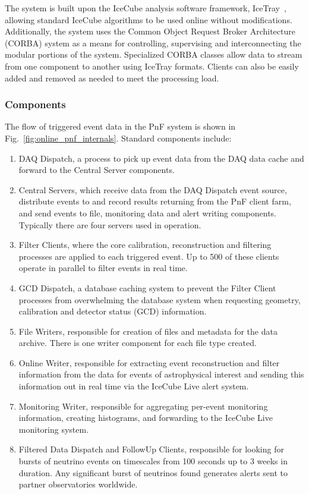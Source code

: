 The system is built upon the IceCube analysis software framework,
IceTray~\cite{DeYoung:2005zz}, allowing standard IceCube algorithms to be
used online without modifications.
Additionally, the system uses the Common Object Request Broker Architecture
(CORBA) system as a means for controlling, supervising and interconnecting
the modular portions of the system.  Specialized CORBA classes allow
data to stream from one component to another using IceTray formats.
Clients can also be easily added and removed as needed to meet the
processing load.

\subsubsection{Components}

The flow of triggered event data in the PnF
system is shown in Fig.~\ref{fig:online_pnf_internals}.  Standard
components include: 
\begin{enumerate}
\item DAQ Dispatch, a process to pick up event data from the DAQ data cache
  and forward to the Central Server components. 
\item Central Servers, which
  receive data from the 
  DAQ Dispatch event source, distribute events to and record results
  returning from the PnF client farm, and send events to file,
  monitoring data and
  alert writing components.  Typically there are four servers used in
  operation.
\item Filter Clients, where the core calibration, reconstruction and
  filtering processes are applied to each triggered event.  Up to 500 of
  these clients operate in parallel to filter 
  events in real time.
\item GCD Dispatch, a database caching system to prevent the
  Filter Client processes from overwhelming the database system when requesting
  geometry, calibration and detector status (GCD) information.  
\item File Writers, responsible for creation of files and metadata for
  the data archive.  There is one writer component for each file type created.
\item Online Writer, responsible for extracting event reconstruction and
  filter information from the data for events of astrophysical interest and
  sending this information out in real time via the IceCube Live alert
  system.
\item Monitoring Writer, responsible for aggregating per-event monitoring
  information, creating histograms, and forwarding to the IceCube Live
  monitoring system.
\item Filtered Data Dispatch and FollowUp Clients, responsible for
  looking for bursts of neutrino events on timescales from 100 seconds up
  to 3 weeks in duration.  Any significant burst of neutrinos found generates alerts
  sent to partner observatories worldwide.
\end{enumerate}

